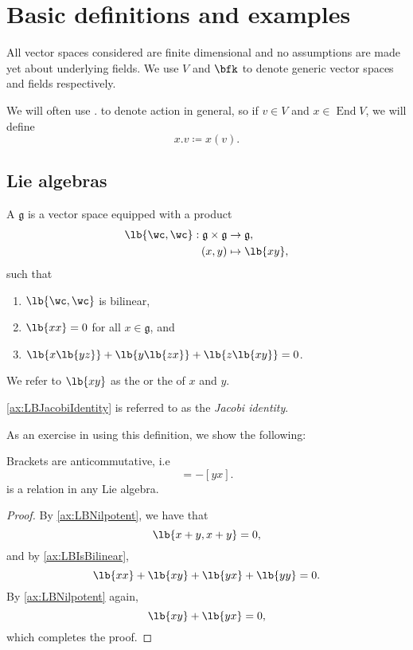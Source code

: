 \documentclass{article}
\DeclarePairedDelimiter\lb\lbrack\rbrack
\DeclareMathOperator{\End}{End}
\newcommand*\frkg{{\ensuremath{\mathfrak{g}}}}
\newcommand*\acts{.}
\begin{document}
\newpage

\section{Basic definitions and examples}

\begin{convention}
    All vector spaces considered are finite dimensional and no assumptions are made yet about underlying fields.
    We use $V$ and $\bfk$ to denote generic vector spaces and fields respectively.

    We will often use $\acts$ to denote action in general, so if $v \in V$ and $x \in \End V$, we will define
    \[
        x \acts v
        \coloneq
        x(v).
    \]
\end{convention}

\subsection{Lie algebras}

\begin{definition}
    A  $\frkg$ is a vector space equipped with a product
    \begin{align*}
        \lb{\wc,\wc}: \frkg \times \frkg
        &\to
        \frkg,
        \\
        (x,y)
        &\mapsto
        \lb{xy},
    \end{align*}
    such that
    \begin{enumerate}[label=(L\arabic*)]
        \item 
            \label{ax:LBIsBilinear}
            $\lb{\wc,\wc}$ is bilinear,
        \item 
            \label{ax:LBNilpotent}
            $\lb{xx} = 0$ for all $x \in \frkg$, and
        \item 
            \label{ax:LBJacobiIdentity}
            $\lb{x\lb{yz}} + \lb{y\lb{zx}} + \lb{z\lb{xy}} = 0$.
    \end{enumerate}
    We refer to $\lb{xy}$ as the  or the  of $x$ and $y$.
\end{definition}

\ref{ax:LBJacobiIdentity} is referred to as the \textit{Jacobi identity}.

As an exercise in using this definition, we show the following:

\begin{proposition}
    Brackets are anticommutative, i.e
    \begin{equation}
        [xy]
        =
        -[yx].
        \tag{L2'}
    \end{equation}
    is a relation in any Lie algebra.
\end{proposition}
\begin{proof}
    By \ref{ax:LBNilpotent}, we have that
    \[
        \lb{x+y,x+y}
        =
        0,
    \]
    and by \ref{ax:LBIsBilinear},
    \[
        \lb{xx} + \lb{xy} + \lb{yx} + \lb{yy}
        =
        0.
    \]
    By \ref{ax:LBNilpotent} again,
    \[
        \lb{xy} + \lb{yx}
        =
        0,
    \]
    which completes the proof.
\end{proof}
\end{document}
